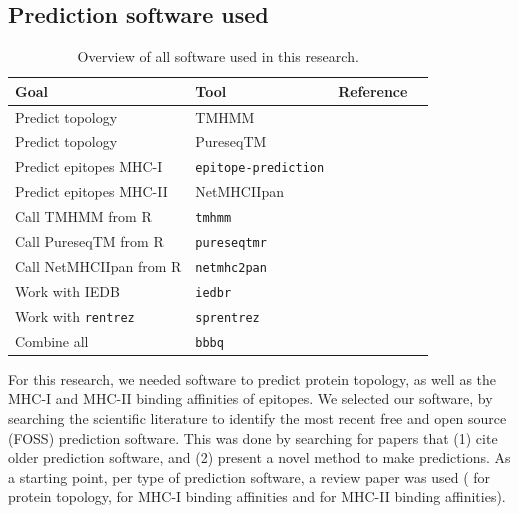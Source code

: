 \subsection{Prediction software used}
\label{subsec:prediction_software_used}

\begin{table}[]
  \begin{tabular}{llll}
    Goal & Tool & Reference \\ 
    \hline
    Predict topology                  & TMHMM                     & \cite{krogh2001predicting} \\
    Predict topology                  & PureseqTM                 & \cite{wang2019efficient} \\
    Predict epitopes MHC-I            & \verb;epitope-prediction; & \cite{bianchi2017} \\
    Predict epitopes MHC-II           & NetMHCIIpan               & \cite{nielsen2008quantitative,karosiene2013netmhciipan} \\
    Call TMHMM from R                 & \verb;tmhmm;              & \cite{tmhmm} \\
    Call PureseqTM from R             & \verb;pureseqtmr;         & \cite{pureseqtmr} \\
    Call NetMHCIIpan from R           & \verb;netmhc2pan;         & \cite{netmhc2pan} \\
    Work with IEDB                    & \verb;iedbr;              & \cite{iedbr} \\
    Work with \verb;rentrez;          & \verb;sprentrez;          & \cite{sprentrez} \\
    Combine all                       & \verb;bbbq;               & \cite{bbbq}
  \end{tabular}
  \caption{
    Overview of all software used in this research.
  }
  \label{table:software_used}
\end{table}


For this research, we needed software to predict protein
topology, as well as the MHC-I and MHC-II binding affinities
of epitopes. We selected our software, by
searching the scientific literature 
to identify the most recent free and open source (FOSS) 
prediction software.
This was done by searching for papers that (1) cite older
prediction software, and (2) present a novel method to make predictions.
As a starting point, per type of prediction software,
a review paper was used (\cite{moller2001evaluation} for protein
topology, \cite{lundegaard2011prediction} for MHC-I
binding affinities and \cite{nielsen2003reliable} for MHC-II binding
affinities). 

